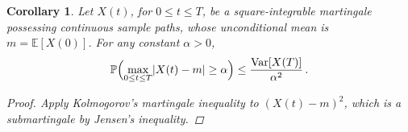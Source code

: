 \documentclass[12pt]{article}
\newcommand{\abs}[1]{\lvert#1\rvert}
\newcommand{\PP}{\mathbb{P}}
\newcommand{\E}{\mathbb{E}}
\newtheorem*{cor*}{Corollary}
\DeclareMathOperator{\Var}{Var}
\begin{document}
\begin{cor*}
Let $X(t)$, for $0 \leq t \leq T$, be a square-integrable martingale
possessing continuous sample paths, whose
 unconditional mean is $m = \E[X(0)]$.
For any constant $\alpha > 0$,
\[
\PP \Bigl( \max_{0 \leq t \leq T} \abs{X(t)-m} \geq \alpha \Bigr)
\leq \frac{\Var[X(T)]}{\alpha^2}\,.
\]
\begin{proof}
Apply Kolmogorov's martingale inequality to $(X(t)-m)^2$,
which is a submartingale by Jensen's inequality.
\end{proof}
\end{cor*}

\end{document}
